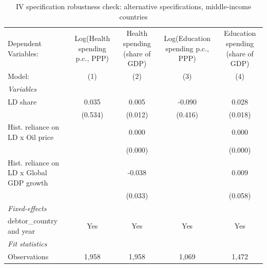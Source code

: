 
\begin{table}[htbp]
   \caption{\label{tab:IV_robustness_alt_specifications_other} IV specification robustness check: alternative specifications, middle-income countries}
   \centering
   \begin{tabular}{lcccc}
      \tabularnewline \midrule \midrule
      Dependent Variables:                     & Log(Health spending p.c., PPP) & Health spending (share of GDP) & Log(Education spending p.c., PPP) & Education spending (share of GDP)\\  
      Model:                                   & (1)                            & (2)                            & (3)                               & (4)\\  
      \midrule
      \emph{Variables}\\
      LD share                                 & 0.035                          & 0.005                          & -0.090                            & 0.028\\   
                                               & (0.534)                        & (0.012)                        & (0.416)                           & (0.018)\\   
      Hist. reliance on LD x Oil price         &                                & 0.000                          &                                   & 0.000\\   
                                               &                                & (0.000)                        &                                   & (0.000)\\   
      Hist. reliance on LD x Global GDP growth &                                & -0.038                         &                                   & 0.009\\   
                                               &                                & (0.033)                        &                                   & (0.058)\\   
      \midrule
      \emph{Fixed-effects}\\
      debtor\_country and year                 & Yes                            & Yes                            & Yes                               & Yes\\  
      \midrule
      \emph{Fit statistics}\\
      Observations                             & 1,958                          & 1,958                          & 1,069                             & 1,472\\  

\end{tabular}
\end{table}
